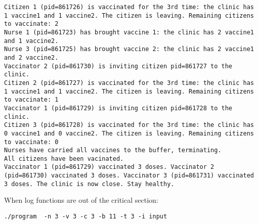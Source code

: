 \documentclass[a4paper]{article}
\begin{document}
\begin{verbatim}
Citizen 1 (pid=861726) is vaccinated for the 3rd time: the clinic has 1 vaccine1 and 1 vaccine2. The citizen is leaving. Remaining citizens to vaccinate: 2
Nurse 1 (pid=861723) has brought vaccine 1: the clinic has 2 vaccine1 and 1 vaccine2.
Nurse 3 (pid=861725) has brought vaccine 2: the clinic has 2 vaccine1 and 2 vaccine2.
Vaccinator 2 (pid=861730) is inviting citizen pid=861727 to the clinic.
Citizen 2 (pid=861727) is vaccinated for the 3rd time: the clinic has 1 vaccine1 and 1 vaccine2. The citizen is leaving. Remaining citizens to vaccinate: 1
Vaccinator 1 (pid=861729) is inviting citizen pid=861728 to the clinic.
Citizen 3 (pid=861728) is vaccinated for the 3rd time: the clinic has 0 vaccine1 and 0 vaccine2. The citizen is leaving. Remaining citizens to vaccinate: 0
Nurses have carried all vaccines to the buffer, terminating.
All citizens have been vacinated.
Vaccinator 1 (pid=861729) vaccinated 3 doses. Vaccinator 2 (pid=861730) vaccinated 3 doses. Vaccinator 3 (pid=861731) vaccinated 3 doses. The clinic is now close. Stay healthy.
\end{verbatim}


\newpage

When log functions are out of the critical section:

\begin{verbatim}
./program  -n 3 -v 3 -c 3 -b 11 -t 3 -i input
\end{verbatim}
\end{document}
